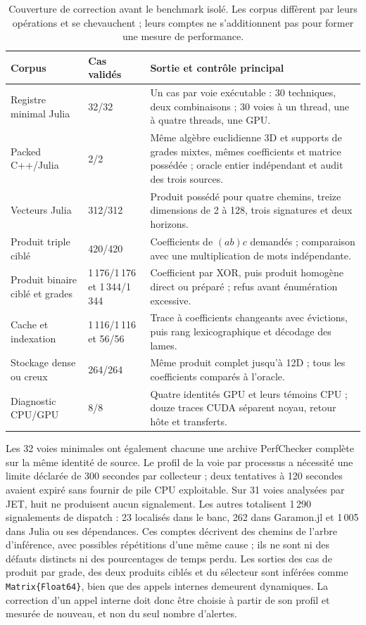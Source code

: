 \documentclass[11pt,a4paper]{article}
\newcommand{\code}[1]{\texttt{#1}}
\begin{document}
\begin{table}[ht]
\centering\small
\begin{tabularx}{\linewidth}{@{}p{34mm}p{25mm}X@{}}
\toprule
Corpus & Cas validés & Sortie et contrôle principal \\
\midrule
Registre minimal Julia & 32/32 & Un cas par voie exécutable : 30 techniques, deux combinaisons ; 30 voies à un thread, une à quatre threads, une GPU. \\
Packed C++/Julia & 2/2 & Même algèbre euclidienne 3D et supports de grades mixtes, mêmes coefficients et matrice possédée ; oracle entier indépendant et audit des trois sources. \\
Vecteurs Julia & 312/312 & Produit possédé pour quatre chemins, treize dimensions de 2 à 128, trois signatures et deux horizons. \\
Produit triple ciblé & 420/420 & Coefficients de $(ab)c$ demandés ; comparaison avec une multiplication de mots indépendante. \\
Produit binaire ciblé et grades & 1\,176/1\,176 et 1\,344/1\,344 & Coefficient par XOR, puis produit homogène direct ou préparé ; refus avant énumération excessive. \\
Cache et indexation & 1\,116/1\,116 et 56/56 & Trace à coefficients changeants avec évictions, puis rang lexicographique et décodage des lames. \\
Stockage dense ou creux & 264/264 & Même produit complet jusqu'à 12D ; tous les coefficients comparés à l'oracle. \\
Diagnostic CPU/GPU & 8/8 & Quatre identités GPU et leurs témoins CPU ; douze traces CUDA séparent noyau, retour hôte et transferts. \\
\bottomrule
\end{tabularx}
\caption{Couverture de correction avant le benchmark isolé. Les corpus
diffèrent par leurs opérations et se chevauchent ; leurs comptes ne
s'additionnent pas pour former une mesure de performance.}
\label{tab:preflightcoverage}
\end{table}

Les 32 voies minimales ont également chacune une archive PerfChecker
complète sur la même identité de source. Le profil de la voie par
processus a nécessité une limite déclarée de 300 secondes par
collecteur ; deux tentatives à 120 secondes avaient expiré sans
fournir de pile CPU exploitable. Sur 31 voies analysées par JET,
huit ne produisent aucun signalement. Les autres totalisent
1\,290 signalements de dispatch : 23 localisés dans le banc, 262 dans
Garamon.jl et 1\,005 dans Julia ou ses dépendances. Ces comptes
décrivent des chemins de l'arbre d'inférence, avec possibles
répétitions d'une même cause ; ils ne sont ni des défauts distincts
ni des pourcentages de temps perdu. Les sorties des cas de produit
par grade, des deux produits ciblés et du sélecteur sont inférées
comme \code{Matrix\{Float64\}}, bien que des appels internes
demeurent dynamiques. La correction d'un appel interne doit donc
être choisie à partir de son profil et mesurée de nouveau, et non
du seul nombre d'alertes.
\end{document}

